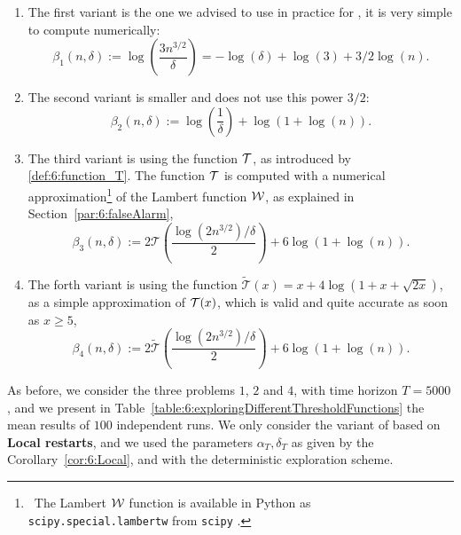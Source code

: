 \begin{enumerate}
    \item
    The first variant is the one we advised to use in practice for \GLRklUCB,
    it is very simple to compute numerically:
    \[ \beta_1(n, \delta) := \log\left(\frac{3 n^{3/2}}{\delta}\right) = -\log(\delta) + \log(3) + 3/2 \log(n). \]

    \item
    The second variant is smaller and does not use this power $3/2$:
    \[ \beta_2(n, \delta) := \log\left(\frac{1}{\delta}\right) + \log(1 + \log(n)). \]

    \item
    The third variant is using the function $\mathcal{T}$, as introduced by \eqref{def:6:function_T}.
    The function $\mathcal{T}$ is computed with a numerical approximation\footnote{~The Lambert $\mathcal{W}$ function is available in Python as \texttt{scipy.special.lambertw} from \texttt{scipy} \cite{scipy}.} of the Lambert function $\mathcal{W}$, as explained in Section~\ref{par:6:falseAlarm},
    \[ \beta_3(n, \delta) := 2 \mathcal{T}\left(\frac{\log(2 n^{3/2}) / \delta}{2}\right) + 6 \log(1 + \log(n)). \]

    \item
    The forth variant is using the function $\widetilde{\mathcal{T}}(x) = x + 4 \log(1 + x + \sqrt{2x})$, as a simple approximation of $\mathcal{T}(x)$, which is valid and quite accurate as soon as $x \geq 5$,
    \[ \beta_4(n, \delta) := 2 \widetilde{\mathcal{T}}\left(\frac{\log(2 n^{3/2}) / \delta}{2}\right) + 6 \log(1 + \log(n)). \]
\end{enumerate}

As before, we consider the three problems $1$, $2$ and $4$, with time horizon $T=5000$,
and we present in Table~\ref{table:6:exploringDifferentThresholdFunctions} the mean results of $100$ independent runs.
We only consider the variant of \GLRklUCB{} based on \textbf{Local restarts}, and we used the parameters $\alpha_T,\delta_T$ as given by the Corollary~\ref{cor:6:Local},
and with the deterministic exploration scheme.

